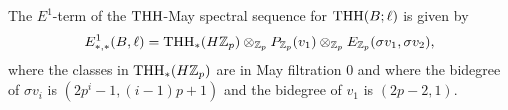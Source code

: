 \begin{comment}
It will also be useful to record the computation of $THH_*(\Z;\Z/p^m)$. This can be computed by a truncation of the Bockstein spectral sequence with signature
\[ THH_*(\Z;\mathbb{F}_p)[v_0]\Rightarrow THH_*(Z)_p\]
so the input is 
\[E(\lambda_1)\otimes P(v_1)\otimes P_{m}(v_0) \]
and there is a map of spectral sequences 
\[ 
	\xymatrix{ 
		THH_*(\Z;\mathbb{F}_p)\otimes P(v_0)\ar@{=>}[r] &  THH_*(\Z)_p \\
		THH_*(\Z;\mathbb{F}_p)\otimes P_{m}(v_0)\ar@{=>}[r] &  THH_*(\Z;\Z/p^m).
		}
\]
The top spectral sequence has differentials $d^{\nu_p(k)}(\mu_1^{k})\dot{=}v_0^{\nu_p(k)}\lambda_1\mu_1^{k-1}$ and since the map of spectral sequences is surjective in each bidegree and an isomorphisms in all bidigreees where it is nontrivial, we can completely determine the differentials in the bottom spectral sequence by the formula
\[ d^{\nu_p(k})(\mu_1^{k})\dot{=}v_0^{\nu_p(k)}\lambda_1\mu_1^{k-1} \mod (v_0)^m .\]
The result is the following corollary. 
\begin{cor}\label{Bokmap}
There is an isomorphism
\[
\pi_t\THH(\Z;\Z/p^m) \cong \begin{cases}
		\Z/p^m & t=0\\
		\Z/p^{\min\{ \nu_p(n),m\}}\{\gamma_n\} & t=2n-1>0\\
		0 & else
	\end{cases}
\]
and the map 
\[\THH_*(\Z)_{(p)}\to \THH_*(\Z;\mathbb{F}_p)\]
factors through the canonical quotient map 
\[\THH_*(\Z)_{(p)}\to \THH_*(\Z;\Z/p^m).\]
\end{cor}
\end{comment}
\begin{comment}
We now describe the computation of the $E^1$-term with less trivial coefficients. Consider the case $M=\ell$. Then the $E^1$-term is
\[ THH_*(H\pi_*B;H\pi_*\ell)\cong THH_*(H\Z_p)\otimes_{\Z_p}(H\Z_p)_*THH(\bbS[v_1,v_2],\bbS[v_1])\]
by essentially the same proof as before. Again, $H\Z_p\wedge THH(\bbS[v_1,v_2],\bbS[v_1])$ is a free $H\Z_p$-algebra so that the B\"okstedt spectral sequence 
\[ HH_*^{\Z_p}((H\Z_p)_*(\bbS[v_1,v_2]),(H\Z_p)_*(\bbS[v_1]))\Rightarrow (H\Z_p)_*THH(\bbS[v_1,v_2],\bbS[v_1])\]
has $E^2$-term $P_{\Z_p}(v_1)\otimes_{\Z_p}E_{\Z_p}(\sigma v_1,\sigma v_2)$ and collapses for bidegree reasons with no extensions. Since 
\[(H\Z_p)_*THH(\bbS[v_1,v_2],\bbS[v_1])\cong P_{\Z_p}(v_1)\otimes_{\Z_p}E_{\Z_p}(\sigma v_1,\sigma v_2)\]
is free, we can again compute the $E^1$-term. 
\end{comment}
\begin{lem}
	The $E^1$-term of the $\operatorname{THH}$-May spectral sequence for $\operatorname{THH}(B;\ell)$ is given by 
	\[
	E^1_{*,*}(B,\ell) = \operatorname{THH}_*(H\mathbb{Z}_p)\otimes_{\mathbb{Z}_p} P_{\mathbb{Z}_p}(v_1)\otimes_{\mathbb{Z}_p}E_{\mathbb{Z}_p}(\sigma v_1, \sigma v_2), 
	\]
	where the classes in $\operatorname{THH}_*(H\mathbb{Z}_p)$ are in May filtration 0 and where the bidegree of $\sigma v_i$ is $(2p^i-1, (i-1)p+1)$ and the bidegree of $v_1$ is $(2p-2,1)$.
\end{lem}

